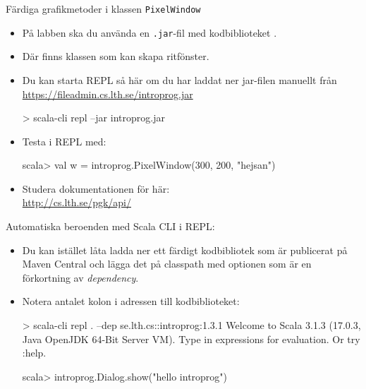 \begin{Slide}{Färdiga grafikmetoder i klassen \texttt{PixelWindow}}\SlideFontSmall

\begin{itemize}
\item På labben ska du använda en \texttt{.jar}-fil med kodbiblioteket .
\item Där finns klassen  som kan skapa ritfönster.
\item Du kan starta REPL så här om du har laddat ner jar-filen manuellt från\\\url{https://fileadmin.cs.lth.se/introprog.jar}  %
\begin{REPLnonum}
> scala-cli repl --jar introprog.jar 
\end{REPLnonum}
\item Testa  i REPL med:
\begin{REPLnonum}
scala> val w = introprog.PixelWindow(300, 200, "hejsan")
\end{REPLnonum}
\item Studera dokumentationen för  här: \\\url{http://cs.lth.se/pgk/api/}
\end{itemize}
\end{Slide}


\begin{Slide}{Automatiska beroenden med Scala CLI i REPL:}
\begin{itemize}\SlideFontSmall
\item Du kan istället låta   ladda ner ett färdigt kodbibliotek som är publicerat på Maven Central och lägga det på classpath med optionen  som är en förkortning av \emph{dependency}. 
\item Notera antalet kolon i adressen till kodbiblioteket:
\begin{REPLsmall}
> scala-cli repl . --dep se.lth.cs::introprog:1.3.1
Welcome to Scala 3.1.3 (17.0.3, Java OpenJDK 64-Bit Server VM).
Type in expressions for evaluation. Or try :help.

scala> introprog.Dialog.show("hello introprog")
\end{REPLsmall}
\end{itemize}
\end{Slide}


